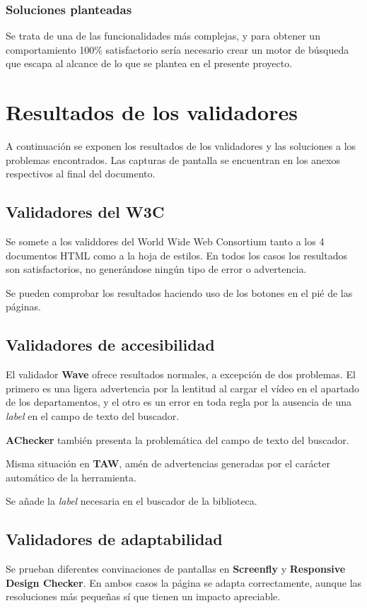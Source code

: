 \documentclass[11pt]{article}
\begin{document}
        \subsubsection{Soluciones planteadas}
        Se trata de una de las funcionalidades más complejas, y para obtener un comportamiento 100\% satisfactorio sería necesario crear un motor de búsqueda que escapa al alcance de lo que se plantea en el presente proyecto.

        \section{Resultados de los validadores}
        A continuación se exponen los resultados de los validadores y las soluciones a los problemas encontrados.
        Las capturas de pantalla se encuentran en los anexos respectivos al final del documento.

        \subsection{Validadores del W3C}
        Se somete a los validdores del World Wide Web Consortium tanto a los 4 documentos HTML como a la hoja de estilos.
        En todos los casos los resultados son satisfactorios, no generándose ningún tipo de error o advertencia.

        Se pueden comprobar los resultados haciendo uso de los botones en el pié de las páginas.

        \subsection{Validadores de accesibilidad}

        El validador \textbf{Wave} ofrece resultados normales, a excepción de dos problemas.
        El primero es una ligera advertencia por la lentitud al cargar el vídeo en el apartado de los departamentos, y el otro es un error en toda regla por la ausencia de una \textit{label} en el campo de texto del buscador.

        \textbf{AChecker} también presenta la problemática del campo de texto del buscador.

        Misma situación en \textbf{TAW}, amén de advertencias generadas por el carácter automático de la herramienta.

        Se añade la \textit{label} necesaria en el buscador de la biblioteca.

        \subsection{Validadores de adaptabilidad}
        Se prueban diferentes convinaciones de pantallas en \textbf{Screenfly} y \textbf{Responsive Design Checker}.
        En ambos casos la página se adapta correctamente, aunque las resoluciones más pequeñas sí que tienen un impacto apreciable.
\end{document}
